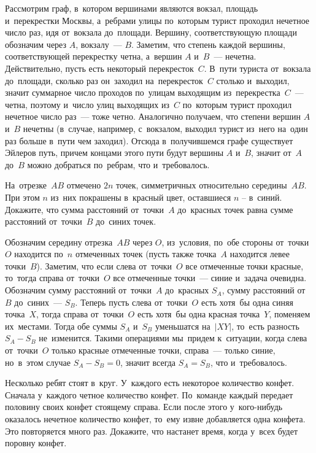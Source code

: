 \ifincludesolutions
Рассмотрим граф, в~котором вершинами являются вокзал, площадь
и~перекрестки Москвы, а~ребрами улицы по~которым турист проходил нечетное число
раз, идя от~вокзала до~площади.
Вершину, соответствующую площади обозначим через $A$, вокзалу~--- $B$.
Заметим, что степень каждой вершины, соответствующей перекрестку четна,
а~вершин $A$ и~$B$~--- нечетна.
Действительно, пусть есть некоторый перекресток~$C$.
В~пути туриста от~вокзала до~площади, сколько раз он~заходил на~перекресток~$C$
столько и~выходил, значит суммарное число проходов по~улицам выходящим
из~перекрестка~$C$~--- четна, поэтому и~число улиц выходящих из~$C$ по~которым
турист проходил нечетное число раз~--- тоже четно.
Аналогично получаем, что степени вершин $A$ и~$B$ нечетны (в~случае, например,
с~вокзалом, выходил турист из~него на~один раз больше в~пути чем заходил).
Отсюда в~получившемся графе существует Эйлеров путь, причем концами этого пути
будут вершины $A$ и~$B$, значит от~$A$ до~$B$ можно добраться по~ребрам, что
и~требовалось.
\fi %

\begin{problems}

\item
На~отрезке~$AB$ отмечено $2 n$ точек, симметричных относительно середины~$AB$.
При этом $n$ из~них покрашены в~красный цвет, оставшиеся $n$ -- в~синий.
Докажите, что сумма расстояний от~точки~$A$ до~красных точек равна сумме
расстояний от~точки~$B$ до~синих точек.

\end{problems}

\ifincludesolutions
Обозначим середину отрезка~$AB$ через $O$, из~условия, по~обе
стороны от~точки~$O$ находится по~$n$ отмеченных точек (пусть также точка~$A$
находится левее точки~$B$).
Заметим, что если слева от~точки~$O$ все отмеченные точки красные, то~тогда
справа от~точки~$O$ все отмеченные точки~--- синие и~задача очевидна.
Обозначим сумму расстояний от~точки~$A$ до~красных $S_A$, сумму расстояний
от~$B$ до~синих~--- $S_B$.
Теперь пусть слева от~точки~$O$ есть хотя~бы одна синяя точка~$X$, тогда справа
от~точки~$O$ есть хотя~бы одна красная точка~$Y$, поменяем их~местами.
Тогда обе суммы $S_A$ и~$S_B$ уменьшатся на~$|XY|$, то~есть разность
$S_A - S_B$ не~изменится.
Такими операциями мы~придем к~ситуации, когда слева от~точки~$O$ только красные
отмеченные точки, справа~--- только синие, но~в~этом случае $S_A - S_B = 0$,
значит всегда $S_A = S_B$, что и~требовалось.
\fi %

\begin{problems}

\item
Несколько ребят стоят в~круг.
У~каждого есть некоторое количество конфет.
Сначала у~каждого четное количество конфет.
По~команде каждый передает половину своих конфет стоящему справа.
Если после этого у~кого-нибудь оказалось нечетное количество конфет, то~ему
извне добавляется одна конфета.
Это повторяется много раз.
Докажите, что настанет время, когда у~всех будет поровну конфет.

\end{problems}

